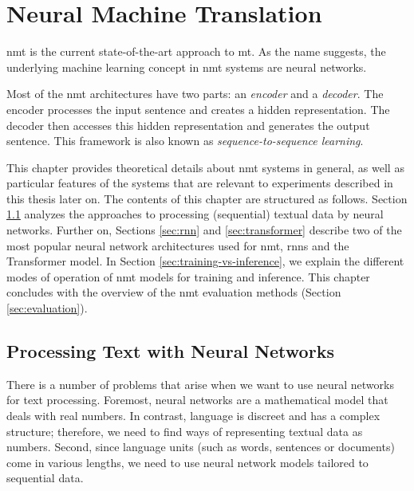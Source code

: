 \chapter{Neural Machine Translation}
\label{chap:nmt}

\gls{nmt} is the current state-of-the-art approach to \gls{mt}. As the name
suggests, the underlying machine learning concept in \gls{nmt} systems are
neural networks.

Most of the \gls{nmt} architectures have two parts: an \emph{encoder} and a
\emph{decoder}. The encoder processes the input sentence and creates a hidden
representation. The decoder then accesses this hidden representation and
generates the output sentence. This framework is also known as \emph{sequence-to-sequence learning}.

This chapter provides theoretical details about \gls{nmt} systems in general, 
as well as particular features of the systems that are relevant to experiments
described in this thesis later on. The contents of this chapter are structured as follows. Section \ref{sec:text-processing} analyzes the approaches to processing (sequential) textual data by neural networks. Further on, Sections \ref{sec:rnn} and \ref{sec:transformer} describe two of the most popular neural network architectures used for \gls{nmt}, \glspl{rnn} and the Transformer model.
In Section \ref{sec:training-vs-inference}, we explain the different modes of
operation of \gls{nmt} models for training and inference. This chapter concludes
with the overview of the \gls{nmt} evaluation methods (Section \ref{sec:evaluation}).


\section{Processing Text with Neural Networks}
\label{sec:text-processing}

There is a number of problems that arise when we want to use neural 
networks for text processing. Foremost, neural networks are a mathematical
model that deals with real numbers. In contrast, language is discreet and has 
a complex structure; therefore, we need to find ways of representing textual
data as numbers. Second, since language units (such as words, sentences or 
documents) come in various lengths, we need to use neural network models
tailored to sequential data.

